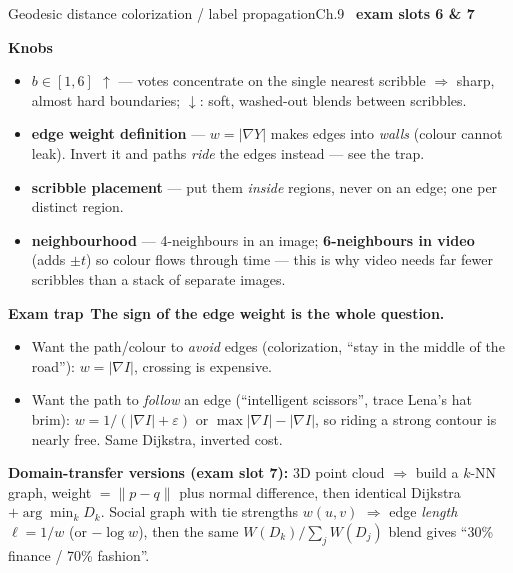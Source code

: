 \documentclass[9pt,a4paper]{extarticle}
\newcommand{\KNOBS}{\par\smallskip\textbf{Knobs}\par\nopagebreak}
\newcommand{\TRAP}{\par\smallskip\textbf{\color{cTrap}Exam trap}\ }
\newcommand{\up}{$\uparrow$}
\newcommand{\dn}{$\downarrow$}
\newcommand{\kn}[2]{\item \textbf{#1} --- #2}
\begin{document}
\begin{card}{Geodesic distance colorization / label propagation}{Ch.9 \textbullet\ \textbf{exam slots 6 \& 7}}
\KNOBS
\begin{itemize}
  \kn{$b\in[1,6]$ \up}{votes concentrate on the single nearest scribble $\Rightarrow$ sharp, almost hard boundaries; \dn: soft, washed-out blends between scribbles.}
  \kn{edge weight definition}{$w=|\nabla Y|$ makes edges into \emph{walls} (colour cannot leak). Invert it and paths \emph{ride} the edges instead --- see the trap.}
  \kn{scribble placement}{put them \emph{inside} regions, never on an edge; one per distinct region.}
  \kn{neighbourhood}{4-neighbours in an image; \textbf{6-neighbours in video} (adds $\pm t$) so colour flows through time --- this is why video needs far fewer scribbles than a stack of separate images.}
\end{itemize}
\TRAP \textbf{The sign of the edge weight is the whole question.}
\begin{itemize}
  \item Want the path/colour to \emph{avoid} edges (colorization, ``stay in the middle of the road''): $w=|\nabla I|$, crossing is expensive.
  \item Want the path to \emph{follow} an edge (``intelligent scissors'', trace Lena's hat brim): $w=1/(|\nabla I|+\varepsilon)$ or $\max|\nabla I|-|\nabla I|$, so riding a strong contour is nearly free. Same Dijkstra, inverted cost.
\end{itemize}
\smallskip
\textbf{Domain-transfer versions (exam slot 7):} 3D point cloud $\Rightarrow$ build a $k$-NN graph, weight $=\|p-q\|$ plus normal difference, then identical Dijkstra $+\arg\min_k D_k$. Social graph with tie strengths $w(u,v)$ $\Rightarrow$ edge \emph{length} $\ell=1/w$ (or $-\log w$), then the same $W(D_k)/\sum_j W(D_j)$ blend gives ``30\% finance / 70\% fashion''.
\end{card}
\end{document}
